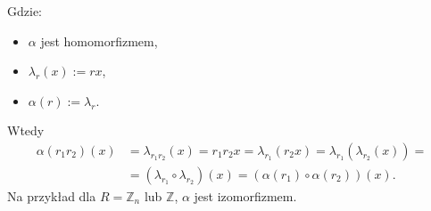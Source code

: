 \begin{enumerate}[label=\arabic*)]
\begin{figure}[H] %
        \centering
\end{figure}

Gdzie:
\begin{itemize}
	\item $\alpha $ jest homomorfizmem,
	\item $\lambda_{r}\left( x \right) := rx$,
	\item $\alpha \left( r \right) := \lambda_{r}$.
\end{itemize}
Wtedy
\begin{align*}
	\alpha \left( r_1r_2 \right) \left( x \right) &= \lambda_{r_1r_2}\left( x \right) = r_1r_2x = \lambda_{r_1}\left( r_2x \right) = \lambda_{r_1}\left( \lambda_{r_2}\left( x \right)  \right) = \\
		       &= \left( \lambda_{r_1}\circ \lambda_{r_2} \right) \left( x \right) = \left( \alpha \left( r_1 \right) \circ \alpha \left( r_2 \right)  \right) \left( x \right)  
.\end{align*}
Na przykład dla $R = \mathbb{Z} _{n}$ lub $\mathbb{Z} $, $\alpha $ jest izomorfizmem.
\end{enumerate}







